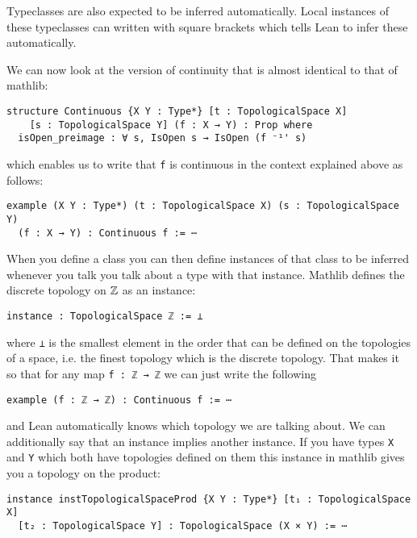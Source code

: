 Typeclasses are also expected to be inferred automatically. 
Local instances of these typeclasses can written with square brackets which tells Lean to infer these automatically.

We can now look at the version of continuity that is almost identical to that of mathlib: 

\begin{lstlisting}
structure Continuous {X Y : Type*} [t : TopologicalSpace X]
    [s : TopologicalSpace Y] (f : X → Y) : Prop where
  isOpen_preimage : ∀ s, IsOpen s → IsOpen (f ⁻¹' s)
\end{lstlisting}

which enables us to write that \lstinline{f} is continuous in the context explained above as follows:

\begin{lstlisting}
example (X Y : Type*) (t : TopologicalSpace X) (s : TopologicalSpace Y) 
  (f : X → Y) : Continuous f := ⋯
\end{lstlisting}

When you define a class you can then define instances of that class to be inferred whenever you talk you talk about a type with that instance. 
Mathlib defines the discrete topology on $\mathbb{Z}$ as an instance: 

\begin{lstlisting}
instance : TopologicalSpace ℤ := ⊥
\end{lstlisting}

where \lstinline{⊥} is the smallest element in the order that can be defined on the topologies of a space, i.e. the finest topology which is the discrete topology. 
That makes it so that for any map \lstinline{f : ℤ → ℤ} we can just write the following

\begin{lstlisting}
example (f : ℤ → ℤ) : Continuous f := ⋯
\end{lstlisting} 

and Lean automatically knows which topology we are talking about. 
We can additionally say that an instance implies another instance. 
If you have types \lstinline{X} and \lstinline{Y} which both have topologies defined on them this instance in mathlib gives you a topology on the product: 

\begin{lstlisting}
instance instTopologicalSpaceProd {X Y : Type*} [t₁ : TopologicalSpace X] 
  [t₂ : TopologicalSpace Y] : TopologicalSpace (X × Y) := ⋯
\end{lstlisting}

